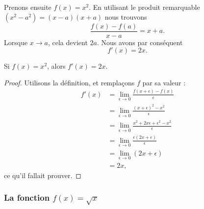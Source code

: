 Prenons ensuite $f(x)=x^2$. En utilisant le produit remarquable $(x^2-a^2)=(x-a)(x+a)$ nous trouvons
\begin{equation}
	\frac{ f(x)-f(a) }{ x-a }=x+a.
\end{equation}
Lorsque $x\to a$, cela devient $2a$. Nous avons par conséquent
\begin{equation}
	f'(x)=2x.
\end{equation}

\begin{lemma}           \label{LemDeccCarr}
    Si $f(x)=x^2$, alors $f'(x)=2x$.
\end{lemma}

\begin{proof}
    Utilisons la définition, et remplaçons $f$ par sa valeur :
    \begin{subequations}
        \begin{align}
            f'(x)   &=\lim_{\epsilon\to 0}\frac{ f(x+\epsilon)-f(x) }{ \epsilon }\\
                &=\lim_{\epsilon\to 0}\frac{ (x+\epsilon)^2-x^2 }{ \epsilon }\\
                &=\lim_{\epsilon\to 0}\frac{ x^2+2x\epsilon+\epsilon^2-x^2 }{ \epsilon }\\
                &=\lim_{\epsilon\to 0}\frac{\epsilon(2x+\epsilon)}{ \epsilon }\\
                &=\lim_{\epsilon\to 0}(2x+\epsilon)\\
                &=2x,
        \end{align}
    \end{subequations}
    ce qu'il fallait prouver.
\end{proof}


\subsubsection{La fonction $f(x)=\sqrt{x}$}

